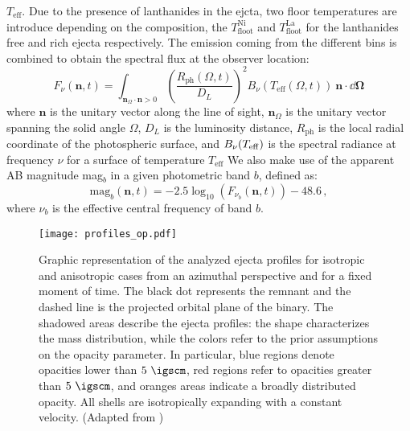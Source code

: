 $T_{\text{eff}}$. Due to the presence of lanthanides in the ejcta, two floor temperatures are introduce 
depending on the composition, the $T_{\text{floot}}^{\text{Ni}}$ and $T_{\text{floot}}^{\text{La}}$ for 
the lanthanides free and rich ejecta respectively.
%
The emission coming from the different bins is combined to obtain the spectral flux at the observer location:
%
\begin{equation}
\label{eq:spectral_flux}
F_{\nu}(\mathbf{n},t) = \int_{\mathbf{n}_{\Omega} \cdot \mathbf{n}> 0} 
\left( \frac{R_{\text{ph}}(\Omega,t)}{D_L} \right)^2  B_{\nu}(T_{\text{eff}}(\Omega,t))~\mathbf{n} \cdot  \dd\boldsymbol{\Omega} 
\end{equation}
%
where $\mathbf{n}$ is the unitary vector along the line of sight, $\mathbf{n}_{\Omega}$ is the unitary 
vector spanning the solid angle $\Omega$, $D_L$ is the luminosity distance, $R_{\text{ph}}$ is the local 
radial coordinate of the photospheric surface, and $B_{\nu}(T_{\rm eff})$ is the spectral radiance at 
frequency $\nu$ for a surface of temperature $T_{\text{eff}}$
%
We also make use of the apparent AB magnitude mag$_b$ in a given photometric band $b$, defined as:
%
\begin{equation}
\label{eq:mag}
\text{mag}_b(\mathbf{n},t) = -2.5 \log_{10}\left( F_{\nu_b}(\mathbf{n},t) \right)-48.6\,,
\end{equation}
where $\nu_b$ is the effective central frequency of band $b$.



\begin{figure}
    \centering 
    \texttt{[image: profiles\_op.pdf]}
    \caption{Graphic representation of the analyzed
        ejecta profiles for isotropic and anisotropic cases
        from an azimuthal perspective and for a fixed moment of time.
        The black dot represents the remnant and the dashed line is the projected orbital
        plane of the binary. The shadowed areas describe the ejecta profiles: the shape
        characterizes the mass distribution, while the colors refer to 
        the prior assumptions on the opacity parameter.
        In particular, blue regions denote opacities lower than $5~\igscm$,
        red regions refer to opacities greater than $5~\igscm$,
        and oranges areas indicate a broadly distributed opacity.
        All shells are isotropically expanding with a constant velocity.
        (Adapted from \citet{Breschi:2021wzr})
    }
    \label{fig:cartoon}
\end{figure}


